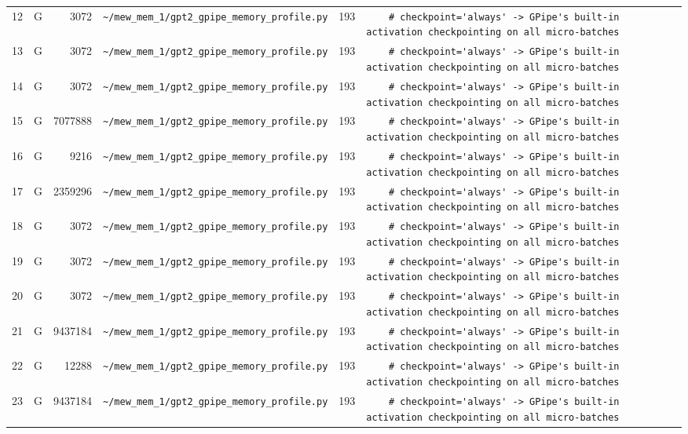 \documentclass{article}
\begin{document}
\begin{longtable}{r l r p{6.5cm} r p{7.0cm}}
12 & G & 3072 & \lstinline|~/mew_mem_1/gpt2_gpipe_memory_profile.py| & 193 & \lstinline|    # checkpoint='always' -> GPipe's built-in activation checkpointing on all micro-batches| \\
13 & G & 3072 & \lstinline|~/mew_mem_1/gpt2_gpipe_memory_profile.py| & 193 & \lstinline|    # checkpoint='always' -> GPipe's built-in activation checkpointing on all micro-batches| \\
14 & G & 3072 & \lstinline|~/mew_mem_1/gpt2_gpipe_memory_profile.py| & 193 & \lstinline|    # checkpoint='always' -> GPipe's built-in activation checkpointing on all micro-batches| \\
15 & G & 7077888 & \lstinline|~/mew_mem_1/gpt2_gpipe_memory_profile.py| & 193 & \lstinline|    # checkpoint='always' -> GPipe's built-in activation checkpointing on all micro-batches| \\
16 & G & 9216 & \lstinline|~/mew_mem_1/gpt2_gpipe_memory_profile.py| & 193 & \lstinline|    # checkpoint='always' -> GPipe's built-in activation checkpointing on all micro-batches| \\
17 & G & 2359296 & \lstinline|~/mew_mem_1/gpt2_gpipe_memory_profile.py| & 193 & \lstinline|    # checkpoint='always' -> GPipe's built-in activation checkpointing on all micro-batches| \\
18 & G & 3072 & \lstinline|~/mew_mem_1/gpt2_gpipe_memory_profile.py| & 193 & \lstinline|    # checkpoint='always' -> GPipe's built-in activation checkpointing on all micro-batches| \\
19 & G & 3072 & \lstinline|~/mew_mem_1/gpt2_gpipe_memory_profile.py| & 193 & \lstinline|    # checkpoint='always' -> GPipe's built-in activation checkpointing on all micro-batches| \\
20 & G & 3072 & \lstinline|~/mew_mem_1/gpt2_gpipe_memory_profile.py| & 193 & \lstinline|    # checkpoint='always' -> GPipe's built-in activation checkpointing on all micro-batches| \\
21 & G & 9437184 & \lstinline|~/mew_mem_1/gpt2_gpipe_memory_profile.py| & 193 & \lstinline|    # checkpoint='always' -> GPipe's built-in activation checkpointing on all micro-batches| \\
22 & G & 12288 & \lstinline|~/mew_mem_1/gpt2_gpipe_memory_profile.py| & 193 & \lstinline|    # checkpoint='always' -> GPipe's built-in activation checkpointing on all micro-batches| \\
23 & G & 9437184 & \lstinline|~/mew_mem_1/gpt2_gpipe_memory_profile.py| & 193 & \lstinline|    # checkpoint='always' -> GPipe's built-in activation checkpointing on all micro-batches| \\

\end{longtable}
\end{document}
